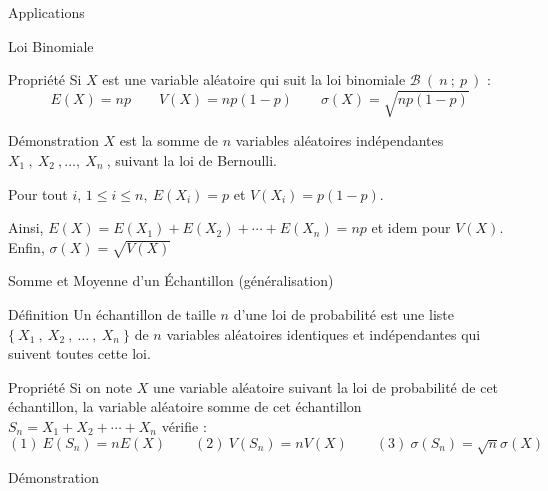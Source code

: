 \documentclass{cours}
\begin{document}
    \begin{Gpartie}{Applications} 
        \begin{Spartie}{Loi Binomiale} 
            \begin{SSpartie}{Propriété} 
                Si $X$ est une variable aléatoire qui suit la loi binomiale $\mathcal{B}~\left(~n~;~p~\right)$ : \[E(X)=np\qquad V(X)=np\left(1-p\right)\qquad\sigma(X)=\sqrt{np\left(1-p\right)}\]
                \begin{SSSpartie}{Démonstration} 
                    $X$ est la somme de $n$ variables aléatoires indépendantes $X_1~,~X_2~,\dotsc,~X_n~$, suivant la loi de Bernoulli.

                    Pour tout $i$, $1\leq i\leq n,~E\left(X_i\right)=p$ et $V\left(X_i\right)=p\left(1-p\right)$.

                    Ainsi, $E(X)=E\left(X_1\right)+E\left(X_2\right)+\dotsb+E\left(X_n\right)=np$ et idem pour $V(X)$. \\
                    Enfin, $\sigma(X)=\sqrt{V(X)}$
                \end{SSSpartie}
            \end{SSpartie}
        \end{Spartie}
        \begin{Spartie}{Somme et Moyenne d'un Échantillon (généralisation)} 
            \begin{SSpartie}{Définition} 
                Un échantillon de taille $n$ d'une loi de probabilité est une liste $\big\{~X_1~,~X_2~,~\dotsc~,~X_n~\big\}$ de $n$ variables aléatoires identiques et indépendantes qui suivent toutes cette loi.
            \end{SSpartie}
            \begin{SSpartie}{Propriété} 
                Si on note $X$ une variable aléatoire suivant la loi de probabilité de cet échantillon, la variable aléatoire \og somme \fg{} de cet échantillon $S_n=X_1+X_2+\dotsb+X_n$ vérifie : \[(1)~E\left(S_n\right)=nE(X)\qquad(2)~V\left(S_n\right)=nV(X)\qquad(3)~\sigma\left(S_n\right)=\sqrt{n}\sigma(X)\]
                \begin{SSSpartie}{Démonstration} 
\end{SSSpartie}
\end{SSpartie}
\end{Spartie}
\end{Gpartie}
\end{document}
